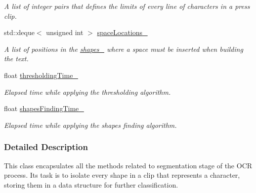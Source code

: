 \begin{CompactItemize}
\begin{CompactList}\small\item\em A list of integer pairs that defines the limits of every line of characters in a press clip. \item\end{CompactList}\item 
\hypertarget{class_segmenter_b6a330577017efe9e49c174c04c4f7c3}{
std::deque$<$ unsigned int $>$ \hyperlink{class_segmenter_b6a330577017efe9e49c174c04c4f7c3}{spaceLocations\_\-}}
\label{class_segmenter_b6a330577017efe9e49c174c04c4f7c3}

\begin{CompactList}\small\item\em A list of positions in the \hyperlink{class_segmenter_41b94ede2829063e0937dc150756e77e}{shapes\_\-} where a space must be inserted when building the text. \item\end{CompactList}\item 
\hypertarget{class_segmenter_1b02328044551876a7b878fc1549bc70}{
float \hyperlink{class_segmenter_1b02328044551876a7b878fc1549bc70}{thresholdingTime\_\-}}
\label{class_segmenter_1b02328044551876a7b878fc1549bc70}

\begin{CompactList}\small\item\em Elapsed time while applying the thresholding algorithm. \item\end{CompactList}\item 
\hypertarget{class_segmenter_e0ade77ddbdc2f6c5eaa1efe372c5a7b}{
float \hyperlink{class_segmenter_e0ade77ddbdc2f6c5eaa1efe372c5a7b}{shapesFindingTime\_\-}}
\label{class_segmenter_e0ade77ddbdc2f6c5eaa1efe372c5a7b}

\begin{CompactList}\small\item\em Elapsed time while applying the shapes finding algorithm. \item\end{CompactList}\end{CompactItemize}


\subsubsection{Detailed Description}
This class encapsulates all the methods related to segmentation stage of the OCR process. Its task is to isolate every shape in a clip that represents a character, storing them in a data structure for further classification.

